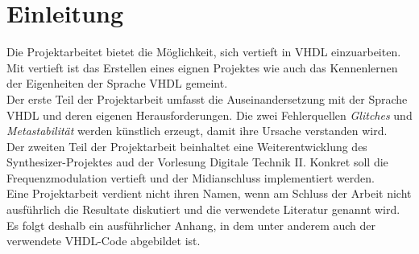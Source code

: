 
\chapter{Einleitung}\label{chap.einleitung}

Die Projektarbeitet bietet die Möglichkeit, sich vertieft in VHDL einzuarbeiten. Mit vertieft ist das Erstellen eines eignen Projektes wie auch  das Kennenlernen der Eigenheiten der Sprache VHDL gemeint.\\

Der erste Teil der Projektarbeit umfasst die Auseinandersetzung mit der Sprache VHDL und deren eigenen Herausforderungen. Die zwei Fehlerquellen \textit{Glitches} und \textit{Metastabilität} werden künstlich erzeugt, damit ihre Ursache verstanden wird. \\

Der zweiten Teil der Projektarbeit beinhaltet eine Weiterentwicklung des Synthesizer-Projektes aud der Vorlesung Digitale Technik II. Konkret soll die Frequenzmodulation vertieft  und der Midianschluss implementiert werden.\\

Eine Projektarbeit verdient nicht ihren Namen, wenn am Schluss der Arbeit nicht ausführlich die Resultate diskutiert und die verwendete Literatur genannt wird. Es folgt deshalb ein ausführlicher Anhang, in dem unter anderem auch der verwendete VHDL-Code abgebildet ist.\\



